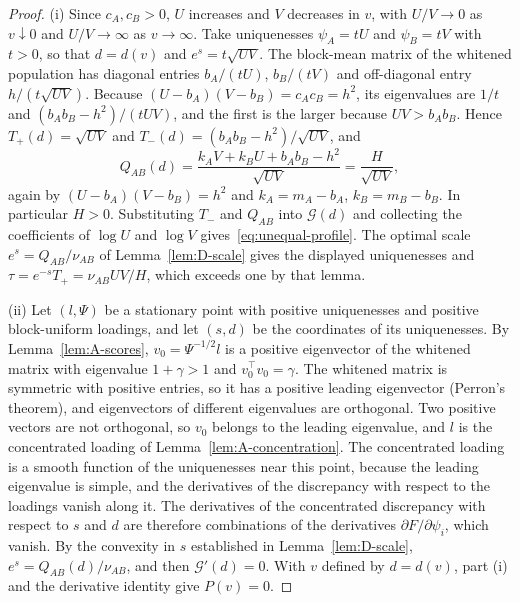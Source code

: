 \begin{proof}
(i) Since $c_A,c_B>0$, $U$ increases and $V$ decreases in $v$, with $U/V\to0$ as $v\downarrow0$ and $U/V\to\infty$ as $v\to\infty$. Take uniquenesses $\psi_A=tU$ and $\psi_B=tV$ with $t>0$, so that $d=d(v)$ and $e^s=t\sqrt{UV}$. The block-mean matrix of the whitened population has diagonal entries $b_A/(tU)$, $b_B/(tV)$ and off-diagonal entry $h/(t\sqrt{UV})$. Because $(U-b_A)(V-b_B)=c_Ac_B=h^2$, its eigenvalues are $1/t$ and $(b_Ab_B-h^2)/(tUV)$, and the first is the larger because $UV>b_Ab_B$. Hence $T_+(d)=\sqrt{UV}$ and $T_-(d)=(b_Ab_B-h^2)/\sqrt{UV}$, and
\[
Q_{AB}(d)=\frac{k_AV+k_BU+b_Ab_B-h^2}{\sqrt{UV}}=\frac H{\sqrt{UV}},
\]
again by $(U-b_A)(V-b_B)=h^2$ and $k_A=m_A-b_A$, $k_B=m_B-b_B$. In particular $H>0$. Substituting $T_-$ and $Q_{AB}$ into $\mathcal G(d)$ and collecting the coefficients of $\log U$ and $\log V$ gives~\eqref{eq:unequal-profile}. The optimal scale $e^s=Q_{AB}/\nu_{AB}$ of Lemma~\ref{lem:D-scale} gives the displayed uniquenesses and $\tau=e^{-s}T_+=\nu_{AB}UV/H$, which exceeds one by that lemma.

(ii) Let $(l,\Psi)$ be a stationary point with positive uniquenesses and positive block-uniform loadings, and let $(s,d)$ be the coordinates of its uniquenesses. By Lemma~\ref{lem:A-scores}, $v_0=\Psi^{-1/2}l$ is a positive eigenvector of the whitened matrix with eigenvalue $1+\gamma>1$ and $v_0^{\top}v_0=\gamma$. The whitened matrix is symmetric with positive entries, so it has a positive leading eigenvector (Perron's theorem), and eigenvectors of different eigenvalues are orthogonal. Two positive vectors are not orthogonal, so $v_0$ belongs to the leading eigenvalue, and $l$ is the concentrated loading of Lemma~\ref{lem:A-concentration}. The concentrated loading is a smooth function of the uniquenesses near this point, because the leading eigenvalue is simple, and the derivatives of the discrepancy with respect to the loadings vanish along it. The derivatives of the concentrated discrepancy with respect to $s$ and $d$ are therefore combinations of the derivatives $\partial F/\partial\psi_i$, which vanish. By the convexity in $s$ established in Lemma~\ref{lem:D-scale}, $e^s=Q_{AB}(d)/\nu_{AB}$, and then $\mathcal G'(d)=0$. With $v$ defined by $d=d(v)$, part (i) and the derivative identity give $P(v)=0$.


\end{proof}
